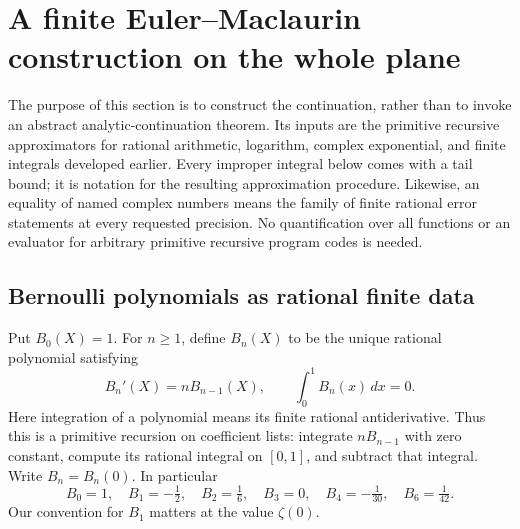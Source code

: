 \section{A finite Euler--Maclaurin construction on the whole plane}
\label{em:section}

The purpose of this section is to construct the continuation, rather than to
invoke an abstract analytic-continuation theorem.  Its inputs are the
primitive recursive approximators for rational arithmetic, logarithm,
complex exponential, and finite integrals developed earlier.  Every
improper integral below comes with a tail bound; it is notation for the
resulting approximation procedure.  Likewise, an equality of named complex
numbers means the family of finite rational error statements at every
requested precision.  No quantification over all functions or an evaluator
for arbitrary primitive recursive program codes is needed.

\subsection{Bernoulli polynomials as rational finite data}

Put $B_0(X)=1$.  For $n\geq1$, define $B_n(X)$ to be the unique rational
polynomial satisfying
\begin{equation}
 B_n'(X)=nB_{n-1}(X),\qquad \int_0^1 B_n(x)\,dx=0.
 \label{em:bernoulli-definition}
\end{equation}
Here integration of a polynomial means its finite rational antiderivative.
Thus this is a primitive recursion on coefficient lists: integrate
$nB_{n-1}$ with zero constant, compute its rational integral on $[0,1]$,
and subtract that integral.  Write $B_n=B_n(0)$.  In particular
\[
 B_0=1,\quad B_1=-\tfrac12,\quad B_2=\tfrac16,\quad B_3=0,
 \quad B_4=-\tfrac1{30},\quad B_6=\tfrac1{42}.
\]
Our convention for $B_1$ matters at the value $\zeta(0)$.

